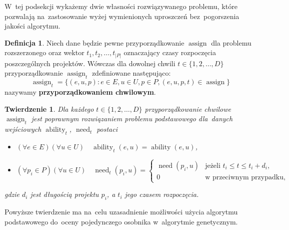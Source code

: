 \documentclass[12pt,a4paper]{article}
\newtheorem{thm}{Twierdzenie}
\theoremstyle{definition}
\newtheorem{defn}{Definicja}
\DeclareMathOperator{\ability}{ability}
\DeclareMathOperator{\need}{need}
\DeclareMathOperator{\assign}{assign}
\begin{document}
\noindent
W~tej podsekcji wykażemy dwie własności rozwiązywanego problemu, które pozwalają na~zastosowanie wyżej wymienionych uproszczeń bez~pogorszenia jakości algorytmu.

\newpage
\begin{defn}
Niech dane będzie pewne przyporządkowanie $\assign$ dla problemu rozszerzonego oraz wektor $t_1, t_2, \dots, t_{|P|}$ oznaczający czasy rozpoczęcia poszczególnych projektów.
Wówczas dla dowolnej chwili $t \in \{ 1, 2, \dots, D \}$ przyporządkowanie $\assign_t$ zdefiniowane następująco:
$$ \assign_t = \{ (e, u, p) : e \in E, u \in U, p \in P, (e, u, p, t) \in \assign \} $$
nazywamy \textbf{przyporządkowaniem chwilowym}.
\end{defn}

\begin{thm}
\label{thm:assignmoment}
Dla każdego $t \in \{ 1, 2, \dots, D \}$ przyporządkowanie chwilowe $\assign_t$ jest poprawnym rozwiązaniem problemu podstawowego dla~danych wejściowych $\ability_t$, $\need_t$ postaci
\begin{itemize}
	\item $(\forall e \in E) (\forall u \in U) \quad \ability_t(e, u) = \ability(e, u)$,
	\item $(\forall p_i \in P) (\forall u \in U) \quad \need_t(p_i, u) = \begin{cases}
		\need(p_i, u) & \text{jeżeli } t_i \leq t \leq t_i + d_i, \\
		0 & \text{w przeciwnym przypadku},
	\end{cases}$
\end{itemize} 
gdzie $d_i$ jest długością projektu $p_i$, a $t_i$ jego czasem rozpoczęcia.
\end{thm}

\noindent
Powyższe twierdzenie ma na~celu uzasadnienie możliwości użycia algorytmu podstawowego do~oceny pojedynczego osobnika w~algorytmie genetycznym.
\end{document}
